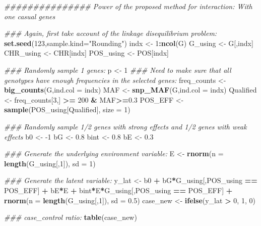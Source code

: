 \documentclass[
]{article}
\newenvironment{Shaded}{\begin{snugshade}}{\end{snugshade}}
\newcommand{\CommentTok}[1]{\textcolor[rgb]{0.56,0.35,0.01}{\textit{#1}}}
\newcommand{\DataTypeTok}[1]{\textcolor[rgb]{0.13,0.29,0.53}{#1}}
\newcommand{\DecValTok}[1]{\textcolor[rgb]{0.00,0.00,0.81}{#1}}
\newcommand{\FloatTok}[1]{\textcolor[rgb]{0.00,0.00,0.81}{#1}}
\newcommand{\KeywordTok}[1]{\textcolor[rgb]{0.13,0.29,0.53}{\textbf{#1}}}
\newcommand{\NormalTok}[1]{#1}
\newcommand{\OperatorTok}[1]{\textcolor[rgb]{0.81,0.36,0.00}{\textbf{#1}}}
\newcommand{\StringTok}[1]{\textcolor[rgb]{0.31,0.60,0.02}{#1}}
\begin{document}
\begin{Shaded}
\begin{Highlighting}[]
\CommentTok{############### Power of the proposed method for interaction: With one casual genes}

\CommentTok{### Again, first take account of the linkage disequilibrium problem:}
\KeywordTok{set.seed}\NormalTok{(}\DecValTok{123}\NormalTok{,}\DataTypeTok{sample.kind=}\StringTok{"Rounding"}\NormalTok{)}
\NormalTok{indx <-}\StringTok{ }\DecValTok{1}\OperatorTok{:}\KeywordTok{ncol}\NormalTok{(G)}
\NormalTok{G_using <-}\StringTok{ }\NormalTok{G[,indx]}
\NormalTok{CHR_using <-}\StringTok{ }\NormalTok{CHR[indx]}
\NormalTok{POS_using <-}\StringTok{ }\NormalTok{POS[indx]}


\CommentTok{### Randomly sample 1 genes:}
\NormalTok{p <-}\StringTok{ }\DecValTok{1}
\CommentTok{### Need to make sure that all genotypes have enough frequencies in the selected genes:}
\NormalTok{freq_counts <-}\StringTok{ }\KeywordTok{big_counts}\NormalTok{(G,}\DataTypeTok{ind.col =}\NormalTok{ indx)}
\NormalTok{MAF <-}\StringTok{ }\KeywordTok{snp_MAF}\NormalTok{(G,}\DataTypeTok{ind.col =}\NormalTok{ indx)}
\NormalTok{Qualified <-}\StringTok{ }\NormalTok{freq_counts[}\DecValTok{3}\NormalTok{,] }\OperatorTok{>=}\StringTok{ }\DecValTok{200} \OperatorTok{&}\StringTok{ }\NormalTok{MAF}\OperatorTok{>=}\FloatTok{0.3}
\NormalTok{POS_EFF <-}\StringTok{ }\KeywordTok{sample}\NormalTok{(POS_using[Qualified], }\DataTypeTok{size =} \DecValTok{1}\NormalTok{)}


\CommentTok{### Randomly sample 1/2 genes with strong effects and 1/2 genes with weak effects}
\NormalTok{b0 <-}\StringTok{ }\DecValTok{-1}
\NormalTok{bG <-}\StringTok{ }\FloatTok{0.8}
\NormalTok{bint <-}\StringTok{ }\FloatTok{0.8}
\NormalTok{bE <-}\StringTok{ }\FloatTok{0.3}


\CommentTok{### Generate the underlying environment variable:}
\NormalTok{E <-}\StringTok{ }\KeywordTok{rnorm}\NormalTok{(}\DataTypeTok{n =} \KeywordTok{length}\NormalTok{(G_using[,}\DecValTok{1}\NormalTok{]), }\DataTypeTok{sd =} \DecValTok{1}\NormalTok{)}

\CommentTok{### Generate the latent variable:}
\NormalTok{y_lat <-}\StringTok{ }\NormalTok{b0 }\OperatorTok{+}\StringTok{ }\NormalTok{bG}\OperatorTok{*}\NormalTok{G_using[,POS_using }\OperatorTok{==}\StringTok{ }\NormalTok{POS_EFF] }\OperatorTok{+}\StringTok{ }\NormalTok{bE}\OperatorTok{*}\NormalTok{E }\OperatorTok{+}\StringTok{ }\NormalTok{bint}\OperatorTok{*}\NormalTok{E}\OperatorTok{*}\NormalTok{G_using[,POS_using }\OperatorTok{==}\StringTok{ }\NormalTok{POS_EFF] }\OperatorTok{+}\StringTok{ }\KeywordTok{rnorm}\NormalTok{(}\DataTypeTok{n =} \KeywordTok{length}\NormalTok{(G_using[,}\DecValTok{1}\NormalTok{]), }\DataTypeTok{sd =} \FloatTok{0.5}\NormalTok{)}
\NormalTok{case_new <-}\StringTok{ }\KeywordTok{ifelse}\NormalTok{(y_lat }\OperatorTok{>}\StringTok{ }\DecValTok{0}\NormalTok{, }\DecValTok{1}\NormalTok{, }\DecValTok{0}\NormalTok{)}

\CommentTok{### case_control ratio: }
\KeywordTok{table}\NormalTok{(case_new)}
\end{Highlighting}
\end{Shaded}
\end{document}
